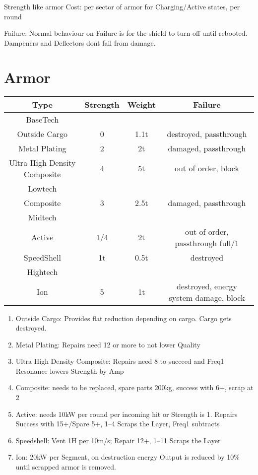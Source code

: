 Strength like armor
Cost:  per sector of armor for Charging/Active states, per round\par
Failure: Normal behaviour on Failure is for the shield to turn off until rebooted.
Dampeners and Deflectors dont fail from damage.

\section{Armor}\label{sec:armor}
\begin{tabular}{c|ccc}
    Type & Strength & Weight & Failure\\
    \hline BaseTech&&&\\
    Outside Cargo & 0 & 1.1t & destroyed, passthrough\\
    Metal Plating & 2 & 2t & damaged, passthrough\\
    Ultra High Density Composite & 4 & 5t & out of order, block\\
    \hline Lowtech &&&\\
    Composite & 3 & 2.5t & damaged, passthrough \\
    \hline Midtech &&&\\
    Active & 1/4 & 2t & out of order, passthrough full/1\\
    SpeedShell & 1t & 0.5t & destroyed \\
    \hline Hightech &&&\\
    Ion & 5 & 1t & destroyed, energy system damage, block \\
\end{tabular}

\begin{enumerate}[label = - ]
    \item Outside Cargo: Provides flat reduction depending on cargo.
    Cargo gets destroyed.
    \item Metal Plating: Repairs need 12 or more to not lower Quality
    \item Ultra High Density Composite: Repairs need 8 to succeed and Freq1 Resonance lowers Strength by Amp
    \item Composite: needs to be replaced, spare parts 200kg, success with 6+, scrap at 2
    \item Active: needs 10kW per round per incoming hit or Strength is 1.
    Repairs Success with 15+/Spare 5+, 1--4 Scraps the Layer, Freq1 subtracts
    \item Speedshell: Vent 1H per 10m/s;
    Repair 12+, 1--11 Scraps the Layer
    \item Ion: 20kW per Segment, on destruction energy Output is reduced by 10\% until scrapped armor is removed.
\end{enumerate}

